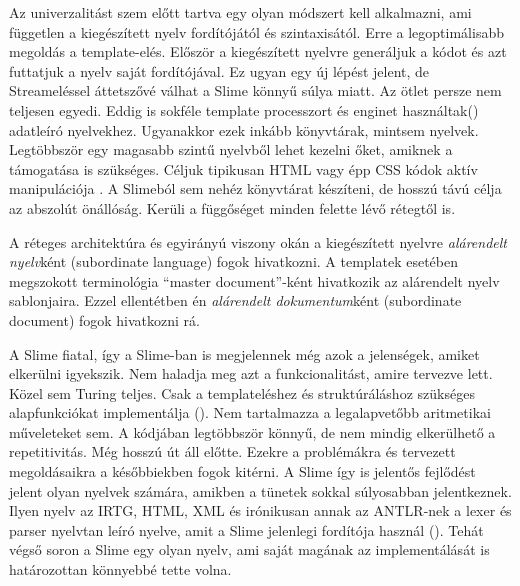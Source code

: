 Az univerzalitást szem előtt tartva egy olyan módszert kell alkalmazni, ami független a kiegészített nyelv fordítójától és szintaxisától. 
Erre a legoptimálisabb  megoldás a template-elés. 
Először a kiegészített nyelvre generáljuk a kódot és azt futtatjuk a nyelv saját fordítójával. 
Ez ugyan egy új lépést jelent, de Streameléssel  áttetszővé válhat a Slime könnyű súlya miatt. 
Az ötlet persze nem teljesen egyedi. 
Eddig is sokféle template processzort és enginet használtak() adatleíró nyelvekhez. 
Ugyanakkor ezek inkább könyvtárak, mintsem nyelvek.
Legtöbbször egy magasabb szintű nyelvből lehet kezelni őket, amiknek a támogatása is szükséges. 
Céljuk tipikusan HTML vagy épp CSS kódok aktív manipulációja . 
A Slimeból sem nehéz könyvtárat készíteni, de hosszú távú célja az abszolút önállóság. 
Kerüli a függőséget minden felette lévő rétegtől is.

A réteges architektúra és egyirányú viszony okán a kiegészített nyelvre \textit{alárendelt nyelv}ként (subordinate language) fogok hivatkozni.
A templatek esetében megszokott terminológia ``master document''-ként hivatkozik az alárendelt nyelv sablonjaira.
Ezzel ellentétben én \textit{alárendelt dokumentum}ként (subordinate document) fogok hivatkozni rá. 

A Slime fiatal, így a Slime-ban is megjelennek még azok a jelenségek, amiket elkerülni igyekszik. 
Nem haladja meg azt a funkcionalitást, amire tervezve lett. 
Közel sem Turing teljes. 
Csak a templateléshez és struktúráláshoz szükséges alapfunkciókat implementálja (). 
Nem tartalmazza a legalapvetőbb aritmetikai műveleteket sem. 
A kódjában legtöbbször könnyű, de nem mindig elkerülhető a repetitivitás. 
Még hosszú út áll előtte. 
Ezekre a problémákra és tervezett megoldásaikra a későbbiekben fogok kitérni. 
A Slime így is jelentős fejlődést jelent olyan nyelvek számára, amikben a tünetek sokkal súlyosabban jelentkeznek. 
Ilyen nyelv az IRTG, HTML, XML és irónikusan annak az ANTLR-nek a lexer és parser nyelvtan leíró nyelve, amit a Slime jelenlegi fordítója használ (). 
Tehát végső soron a Slime egy olyan nyelv, ami saját magának az implementálását is határozottan könnyebbé tette volna.


